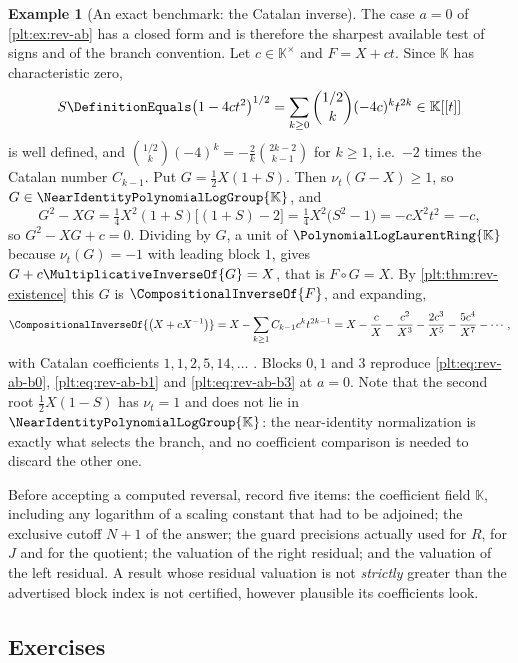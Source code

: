 \documentclass[11pt,oneside]{article}
\theoremstyle{plain}
\theoremstyle{definition}
\newtheorem{example}[theorem]{Example}
\theoremstyle{remark}
\newcommand{\K}{\mathbb{K}}
\newcommand{\PLlau}{\PolynomialLogLaurentRing{\K}}       %
\newcommand{\Gnear}{\NearIdentityPolynomialLogGroup{\K}} %
\newcommand{\ordt}{\nu_{t}}                              %
\newcommand{\compose}{\mathbin{\circ}}
\newcommand{\rev}[1]{\CompositionalInverseOf{#1}}
\begin{document}
\begin{example}[An exact benchmark: the Catalan inverse]
\label{plt:ex:rev-catalan}
The case \(a=0\) of \cref{plt:ex:rev-ab} has a closed form and is therefore the
sharpest available test of signs and of the branch convention.  Let
\(c\in\K^\times\) and \(F=X+ct\).  Since \(\K\) has characteristic zero,
\[
 S\DefinitionEquals\bigl(1-4ct^2\bigr)^{1/2}
 =\sum_{k\ge0}\binom{1/2}{k}(-4c)^kt^{2k}\in\K[[t]]
\]
is well defined, and \(\binom{1/2}{k}(-4)^k=-\tfrac2k\binom{2k-2}{k-1}\) for
\(k\ge1\), i.e.\ \(-2\) times the Catalan number \(C_{k-1}\).  Put
\(G=\tfrac12X(1+S)\).  Then \(\ordt(G-X)\ge1\), so \(G\in\Gnear\), and
\[
 G^2-XG=\tfrac14X^2(1+S)\bigl[(1+S)-2\bigr]=\tfrac14X^2\bigl(S^2-1\bigr)
 =-cX^2t^2=-c,
\]
so \(G^2-XG+c=0\).  Dividing by \(G\), a unit of \(\PLlau\) because
\(\ordt(G)=-1\) with leading block \(1\), gives
\(G+c\MultiplicativeInverseOf{G}=X\), that is \(F\compose G=X\).  By
\cref{plt:thm:rev-existence} this \(G\) is \(\rev{F}\), and expanding,
\[
 \rev{\bigl(X+cX^{-1}\bigr)}
 =X-\sum_{k\ge1}C_{k-1}c^kt^{2k-1}
 =X-\frac cX-\frac{c^2}{X^3}-\frac{2c^3}{X^5}-\frac{5c^4}{X^7}-\cdots,
\]
with Catalan coefficients \(1,1,2,5,14,\dots\)
\cite{comtet-book,graham-knuth-patashnik}.  Blocks \(0,1\) and \(3\) reproduce
\eqref{plt:eq:rev-ab-b0}, \eqref{plt:eq:rev-ab-b1} and
\eqref{plt:eq:rev-ab-b3} at \(a=0\).  Note that the second root
\(\tfrac12X(1-S)\) has \(\ordt=1\) and does not lie in \(\Gnear\): the
near-identity normalization is exactly what selects the branch, and no
coefficient comparison is needed to discard the other one.
\end{example}

\begin{checkpointbox}
Before accepting a computed reversal, record five items: the coefficient field
\(\K\), including any logarithm of a scaling constant that had to be adjoined;
the exclusive cutoff \(N+1\) of the answer; the guard precisions actually used
for \(R\), for \(J\) and for the quotient; the valuation of the right residual;
and the valuation of the left residual.  A result whose residual valuation is
not \emph{strictly} greater than the advertised block index is not certified,
however plausible its coefficients look.
\end{checkpointbox}

\subsection{Exercises}
\label{plt:sec:rev-exercises}
\end{document}
